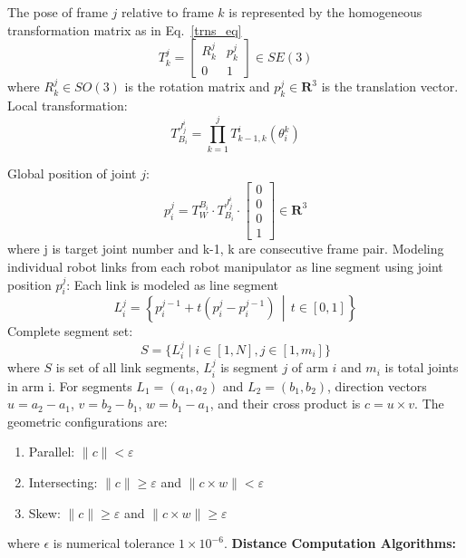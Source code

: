 \documentclass[10pt,twocolumn]{ICCAS}
\begin{document}
The pose of frame $j$ relative to frame $k$ is represented by the homogeneous transformation matrix as in Eq.~\ref{trns_eq}
\begin{equation}
T_k^j = \begin{bmatrix} R_k^j & p_k^j \\ 0 & 1 \end{bmatrix} \in SE(3)
\label{trns_eq}
\end{equation}
where $R_k^j \in SO(3)$ is the rotation matrix and $p_k^j \in \mathbf{R}^3$ is the translation vector.\newline
Local transformation:
\[
T_{B_i}^{J_j^i} = \prod_{k=1}^{j} T_{k-1,k}^i(\theta_i^k)
\]

Global position of joint $j$:
\[
p_i^j = T_W^{B_i} \cdot T_{B_i}^{J_j^i} \cdot \begin{bmatrix}0\\0\\0\\1\end{bmatrix} \in \mathbf{R}^3
\]
where j is target joint number and k-1, k are consecutive frame pair.\newline
Modeling individual robot links from each robot manipulator as line segment using joint position $p_i^j$:\newline
Each link is modeled as line segment
\[
L_i^j = \left\{ p_i^{j-1} + t(p_i^j - p_i^{j-1}) \,\middle|\, t \in [0,1] \right\}
\]
Complete segment set: \[{S} = \{L_i^j \mid i \in [1,N], j \in [1,m_i] \}\]
where ${S}$ is set of all link segments, $L_i^j$ is segment $j$ of arm $i$ and $m_{i}$ is total joints in arm i. \newline
For segments $L_1 = (a_1, a_2)$ and $L_2 = (b_1, b_2)$, direction vectors $u = a_2 - a_1$, $v = b_2 - b_1$, $w = b_1 - a_1$, and their cross product is $c = u \times v$. The geometric configurations are:\newline
\begin{enumerate}[label=\roman*), leftmargin=*, align=left]
    \item Parallel: $\|c\| < \varepsilon$
    \item Intersecting: $\|c\| \geq \varepsilon$ and $\|c \times w\| < \varepsilon$
    \item Skew: $\|c\| \geq \varepsilon$ and $\|c \times w\| \geq \varepsilon$
\end{enumerate}
where $\epsilon$ is numerical tolerance $1\times10^{-6}$.\newline 
\textbf{Distance Computation Algorithms:}\newline
\end{document}

